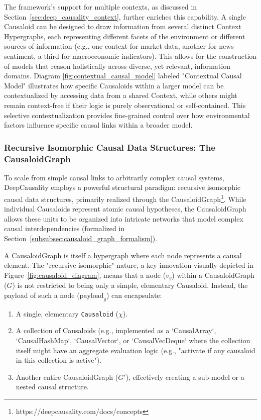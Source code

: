 The framework's support for multiple contexts, as discussed in Section~\ref{sec:deep_causality_context}, further enriches this capability. A single Causaloid can be designed to draw information from several distinct Context Hypergraphs, each representing different facets of the environment or different sources of information (e.g., one context for market data, another for news sentiment, a third for macroeconomic indicators). This allows for the construction of models that reason holistically across diverse, yet relevant, information domains. Diagram \ref{fig:contextual_causal_model} labeled "Contextual Causal Model" illustrates how specific Causaloids within a larger model can be contextualized by accessing data from a shared Context, while others might remain context-free if their logic is purely observational or self-contained. This selective contextualization provides fine-grained control over how environmental factors influence specific causal links within a broader model.

\newpage

\subsubsection{Recursive Isomorphic Causal Data Structures: The CausaloidGraph}
\label{subsubsec:recursive_isomorphic_causal_structures}

To scale from simple causal links to arbitrarily complex causal systems, DeepCausality employs a powerful structural paradigm: recursive isomorphic causal data structures, primarily realized through the CausaloidGraph\footnote{https://deepcausality.com/docs/concepts}. While individual Causaloids represent atomic causal hypotheses, the CausaloidGraph allows these units to be organized into intricate networks that model complex causal interdependencies (formalized in Section~\ref{subsubsec:causaloid_graph_formalism}).

A CausaloidGraph is itself a hypergraph where each node represents a causal element. The "recursive isomorphic" nature, a key innovation visually depicted in Figure~\ref{fig:causaloid_diagram}, means that a node ($v_g$) within a CausaloidGraph ($G$) is not restricted to being only a simple, elementary Causaloid. Instead, the payload of such a node ($\text{payload}_g$) can encapsulate:
\begin{enumerate}
    \item A single, elementary \texttt{Causaloid} ($\chi$).
    \item A collection of Causaloids (e.g., implemented as a `CausalArray`, `CausalHashMap`, `CausalVector`, or `CausalVecDeque` where the collection itself might have an aggregate evaluation logic (e.g., "activate if any causaloid in this collection is active").
    \item Another entire CausaloidGraph ($G'$), effectively creating a sub-model or a nested causal structure.
\end{enumerate}

